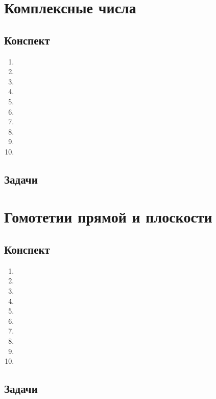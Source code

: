 \section{Комплексные числа}

\subsection*{Конспект}
\begin{enumerate}\setlength{\itemsep}{1pt}
\item 
\item 
\item 
\item 
\item 
\item 
\item 
\item 
\item 
\item 
\end{enumerate}
\subsection*{Задачи}



\section{Гомотетии прямой и плоскости}

\subsection*{Конспект}
\begin{enumerate}\setlength{\itemsep}{1pt}
\item 
\item 
\item 
\item 
\item 
\item 
\item 
\item 
\item 
\item 
\end{enumerate}
\subsection*{Задачи}

